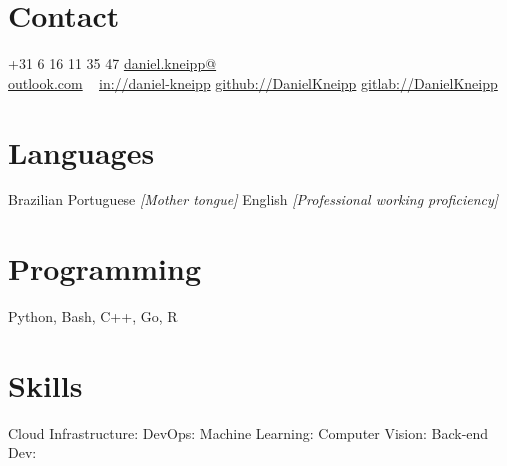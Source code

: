\documentclass[a4paper]{cv-friggeri-x}
\begin{document}


\begin{aside} %
\section{Contact}
{\Large\textcolor{gray}{\Mobilefone}} \hfill +31 6 16 11 35 47
{\Large\textcolor{gray}{\Letter}} \hfill \href{mailto:daniel.kneipp@outlook.com}{daniel.kneipp@\\outlook.com}
~
\llogo \hfill \href{https://www.linkedin.com/in/daniel-kneipp/}{in://daniel-kneipp}
\githublogo \hfill \href{https://github.com/DanielKneipp}{github://DanielKneipp}
\gitlablogo \hfill \href{https://gitlab.com/DanielKneipp}{gitlab://DanielKneipp}
\section{Languages}
Brazilian Portuguese \hspace{5mm}\null
\textit{\footnotesize{[Mother tongue]}}
English  \hspace{5mm}\null
\textit{\footnotesize{[Professional working proficiency]}}
\section{Programming}
Python, Bash,
C++, Go, R
\section{Skills}
Cloud Infrastructure: \hspace{5mm}\null
{}
DevOps:               \hspace{5mm}\null
{}
Machine Learning:     \hspace{5mm}\null
{}
Computer Vision:      \hspace{5mm}\null
{}
Back-end Dev:         \hspace{5mm}\null
{}
\end{aside}
\end{document}
